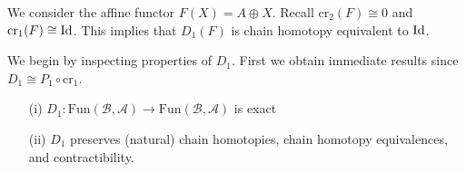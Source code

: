 \begin{eg}
    We consider the affine functor $F(X) = A\oplus X$. Recall $\text{cr}_2(F) \cong 0$ and $\text{cr}_1(F) \cong \operatorname{Id}$. This implies that $D_1(F)$ is chain homotopy equivalent to $\operatorname{Id}$.
\end{eg}

We begin by inspecting properties of $D_1$. First we obtain immediate results since $D_1\cong P_1\circ \text{cr}_1$.

\begin{prop}[label=prop:D1Exact]
    \begin{itemize}
        \item[(i)] $D_1:\text{Fun}(\mathcal{B},\mathcal{A})\to \text{Fun}(\mathcal{B},\mathcal{A})$ is exact
        \item[(ii)] $D_1$ preserves (natural) chain homotopies, chain homotopy equivalences, and contractibility.
    \end{itemize}
\end{prop}
